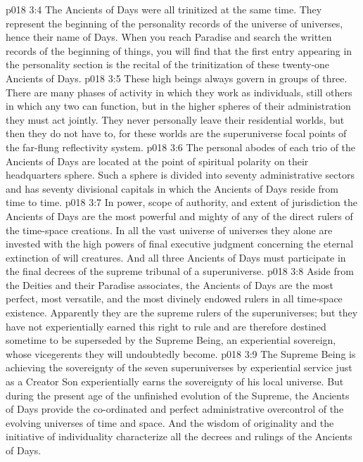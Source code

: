 \pc \vs p018 3:4 The Ancients of Days were all trinitized at the same time. They represent the beginning of the personality records of the universe of universes, hence their name of Days. When you reach Paradise and search the written records of the beginning of things, you will find that the first entry appearing in the personality section is the recital of the trinitization of these twenty\hyp{}one Ancients of Days.
\pc \vs p018 3:5 These high beings always govern in groups of three. There are many phases of activity in which they work as individuals, still others in which any two can function, but in the higher spheres of their administration they must act jointly. They never personally leave their residential worlds, but then they do not have to, for these worlds are the superuniverse focal points of the far\hyp{}flung reflectivity system.
\vs p018 3:6 The personal abodes of each trio of the Ancients of Days are located at the point of spiritual polarity on their headquarters sphere. Such a sphere is divided into seventy administrative sectors and has seventy divisional capitals in which the Ancients of Days reside from time to time.
\vs p018 3:7 In power, scope of authority, and extent of jurisdiction the Ancients of Days are the most powerful and mighty of any of the direct rulers of the time\hyp{}space creations. In all the vast universe of universes they alone are invested with the high powers of final executive judgment concerning the eternal extinction of will creatures. And all three Ancients of Days must participate in the final decrees of the supreme tribunal of a superuniverse.
\pc \vs p018 3:8 Aside from the Deities and their Paradise associates, the Ancients of Days are the most perfect, most versatile, and the most divinely endowed rulers in all time\hyp{}space existence. Apparently they are the supreme rulers of the superuniverses; but they have not experientially earned this right to rule and are therefore destined sometime to be superseded by the Supreme Being, an experiential sovereign, whose vicegerents they will undoubtedly become.
\vs p018 3:9 The Supreme Being is achieving the sovereignty of the seven superuniverses by experiential service just as a Creator Son experientially earns the sovereignty of his local universe. But during the present age of the unfinished evolution of the Supreme, the Ancients of Days provide the co\hyp{}ordinated and perfect administrative overcontrol of the evolving universes of time and space. And the wisdom of originality and the initiative of individuality characterize all the decrees and rulings of the Ancients of Days.
